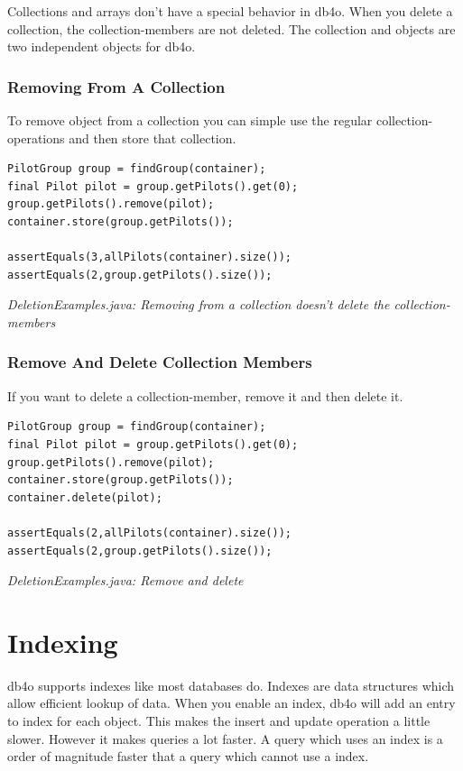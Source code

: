 Collections and arrays don't have a special behavior in db4o. When you delete a collection, the collection-members are not deleted. The collection and objects are two independent objects for db4o.

\subsubsection*{Removing From A Collection}

To remove object from a collection you can simple use the regular collection-operations and then store that collection.

\begin{lstlisting}
PilotGroup group = findGroup(container);
final Pilot pilot = group.getPilots().get(0);
group.getPilots().remove(pilot);
container.store(group.getPilots());

assertEquals(3,allPilots(container).size());
assertEquals(2,group.getPilots().size());
\end{lstlisting}

{\small\itshape DeletionExamples.java: Removing from a collection doesn't delete the collection-members\par}
\medskip

\subsubsection*{Remove And Delete Collection Members}

If you want to delete a collection-member, remove it and then delete it.

\begin{lstlisting}
PilotGroup group = findGroup(container);
final Pilot pilot = group.getPilots().get(0);
group.getPilots().remove(pilot);
container.store(group.getPilots());
container.delete(pilot);

assertEquals(2,allPilots(container).size());
assertEquals(2,group.getPilots().size());
\end{lstlisting}

{\small\itshape DeletionExamples.java: Remove and delete\par}
\medskip

\section{Indexing}
\label{ref:basics-indexing}

db4o supports indexes like most databases do. Indexes are data structures which allow efficient lookup of data. When you enable an index, db4o will add an entry to index for each object. This makes the insert and update operation a little slower. However it makes queries a lot faster. A query which uses an index is a order of magnitude faster that a query which cannot use a index.

